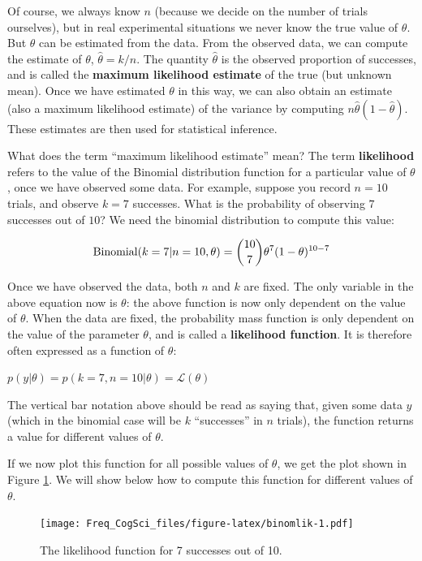 \documentclass[12pt,]{krantz}
\begin{document}
Of course, we always know \(n\) (because we decide on the number of trials ourselves), but in real experimental situations we never know the true value of \(\theta\). But \(\theta\) can be estimated from the data. From the observed data, we can compute the estimate of \(\theta\), \(\hat \theta=k/n\). The quantity \(\hat \theta\) is the observed proportion of successes, and is called the \textbf{maximum likelihood estimate} of the true (but unknown mean). Once we have estimated \(\theta\) in this way, we can also obtain an estimate (also a maximum likelihood estimate) of the variance by computing \(n\hat\theta (1-\hat\theta)\). These estimates are then used for statistical inference.

What does the term ``maximum likelihood estimate'' mean? The term \textbf{likelihood} refers to the value of the Binomial distribution function for a particular value of \(\theta\), once we have observed some data. For example, suppose you record \(n=10\) trials, and observe \(k=7\) successes. What is the probability of observing \(7\) successes out of \(10\)? We need the binomial distribution to compute this value:

\begin{equation}
\hbox{Binomial}(k=7|n=10,\theta) = 
\binom{10}{7} \theta^{7} (1-\theta)^{10-7}
\end{equation}

Once we have observed the data, both \(n\) and \(k\) are fixed. The only variable in the above equation now is \(\theta\): the above function is now only dependent on the value of \(\theta\). When the data are fixed, the probability mass function is only dependent on the value of the parameter \(\theta\), and is called a \textbf{likelihood function}. It is therefore often expressed as a function of \(\theta\):

\(p( y | \theta ) = p( k=7, n=10 | \theta) = \mathcal{L}(\theta)\)

The vertical bar notation above should be read as saying that, given some data \(y\) (which in the binomial case will be \(k\) ``successes'' in \(n\) trials), the function returns a value for different values of \(\theta\).

If we now plot this function for all possible values of \(\theta\), we get the plot shown in Figure \ref{fig:binomlik}. We will show below how to compute this function for different values of \(\theta\).

\begin{figure}
\centering
\texttt{[image: Freq\_CogSci\_files/figure-latex/binomlik-1.pdf]}
\caption{\label{fig:binomlik}The likelihood function for 7 successes out of 10.}
\end{figure}
\end{document}
